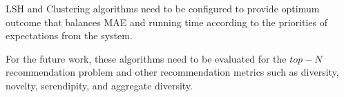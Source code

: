 \documentclass[conference]{IEEEtran}
\begin{document}
LSH and Clustering algorithms need to be configured to provide optimum outcome 
that balances MAE and running time according to the priorities of expectations
from the system.

For the future work, these algorithms need to be evaluated for the $top-N$ 
recommendation problem and other recommendation metrics such as diversity, 
novelty, serendipity, and aggregate diversity.


 

\end{document}
